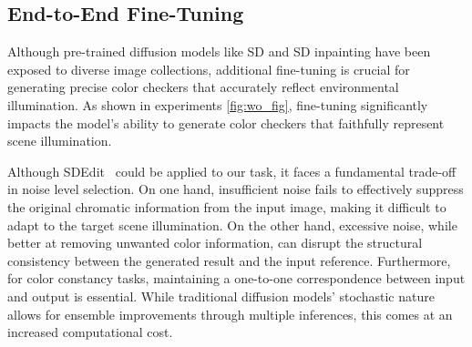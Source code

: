 
% 

\subsection{End-to-End Fine-Tuning}
\label{sec:end_to_end_finetune}

Although pre-trained diffusion models like SD and SD inpainting \cite{rombach2021highresolution} have been exposed to diverse image collections, additional fine-tuning is crucial for generating precise color checkers that accurately reflect environmental illumination. As shown in experiments \cref{fig:wo_fig}, fine-tuning significantly impacts the model's ability to generate color checkers that faithfully represent scene illumination.



Although SDEdit~\cite{meng2022sdeditguidedimagesynthesis} could be applied to our task, it faces a fundamental trade-off in noise level selection. On one hand, insufficient noise fails to effectively suppress the original chromatic information from the input image, making it difficult to adapt to the target scene illumination. On the other hand, excessive noise, while better at removing unwanted color information, can disrupt the structural consistency between the generated result and the input reference. Furthermore, for color constancy tasks, maintaining a one-to-one correspondence between input and output is essential. While traditional diffusion models' stochastic nature allows for ensemble improvements through multiple inferences, this comes at an increased computational cost.


